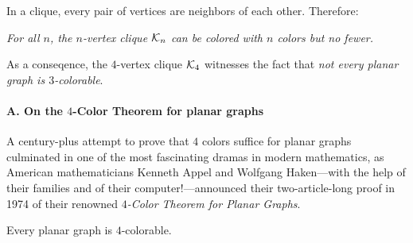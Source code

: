 \bigskip

\noindent {}

\bigskip

\noindent
In a clique, every pair of vertices are neighbors of each other.  Therefore:

\smallskip

{\em For all $n$, the $n$-vertex clique $\mbox{$\cal K$}_n$ can be colored with $n$ colors but no fewer.}

\smallskip

\noindent
As a conseqence, the $4$-vertex clique $\mbox{$\cal K$}_4$ witnesses the fact that
{\em not every planar graph is $3$-colorable}.

\bigskip

  

\paragraph{A. On the $4$-Color Theorem for planar graphs}

A century-plus attempt to prove that $4$ colors suffice for planar graphs culminated in one 
of the most fascinating dramas in modern mathematics, as American mathematicians
Kenneth Appel and Wolfgang Haken---with the help of their families and of their
computer!---announced their two-article-long proof in 1974 of their renowned
{\it $4$-Color Theorem for Planar Graphs}.  

\begin{theorem}
\label{thm:Four-ColorTheorem}
Every planar graph is $4$-colorable.
\end{theorem}

